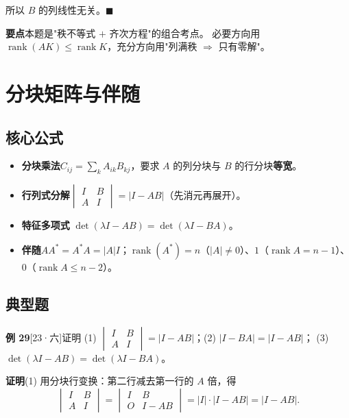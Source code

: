\documentclass[10pt]{ctexart}
\newcommand{\rank}{\operatorname{rank}}
\newcommand{\yiii}[1]{\textcolor{y23}{[23·#1]}}
\begin{document}
所以 $B$ 的列线性无关。$\blacksquare$

\begin{tipbox}
\textbf{要点}\quad 本题是"秩不等式 $+$ 齐次方程"的组合考点。
必要方向用 $\rank(AK)\le\rank K$，充分方向用"列满秩 $\Rightarrow$ 只有零解"。
\end{tipbox}

\section{分块矩阵与伴随}

\subsection{核心公式}

\begin{itemize}
\item \textbf{分块乘法}\quad $C_{ij}=\sum_k A_{ik}B_{kj}$，要求 $A$ 的列分块与 $B$ 的行分块\textbf{等宽}。
\item \textbf{行列式分解}\quad $\begin{vmatrix}I&B\\A&I\end{vmatrix}=|I-AB|$（先消元再展开）。
\item \textbf{特征多项式} \quad $\det(\lambda I-AB)=\det(\lambda I-BA)$。
\item \textbf{伴随}\quad $AA^{*}=A^{*}A=|A|I$；$\rank(A^{*})=n$（$|A|\ne0$）、$1$（$\rank A=n-1$）、$0$（$\rank A\le n-2$）。
\end{itemize}

\subsection{典型题}

\textbf{例 29}\yiii{六}\quad 证明 (1) $\begin{vmatrix}I&B\\A&I\end{vmatrix}=|I-AB|$；(2) $|I-BA|=|I-AB|$；
(3) $\det(\lambda I-AB)=\det(\lambda I-BA)$。

\textbf{证明}\quad (1) 用分块行变换：第二行减去第一行的 $A$ 倍，得
\[
\begin{vmatrix}I&B\\A&I\end{vmatrix}
=\begin{vmatrix}I&B\\O&I-AB\end{vmatrix}=|I|\cdot|I-AB|=|I-AB| .
\]
\end{document}
